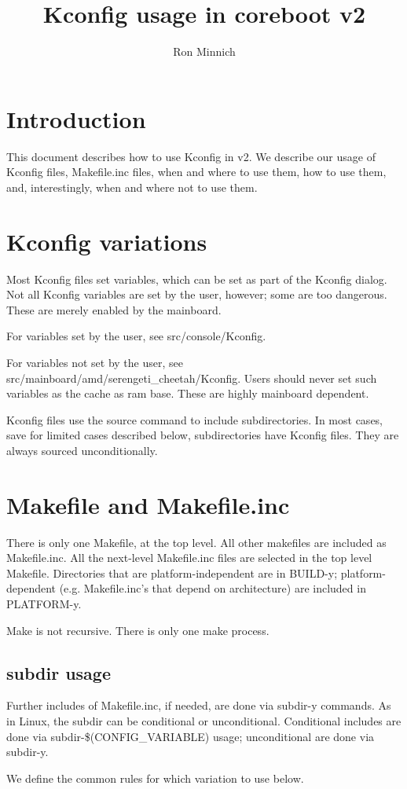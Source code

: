 \documentclass[10pt,letterpaper]{article}
\author{Ron Minnich}
\title{Kconfig usage in coreboot v2}
\begin{document}
\section{Introduction}
This document describes how to use Kconfig in v2. We describe our usage of Kconfig files, Makefile.inc files, when and where to use them, how to use them, and, interestingly, when and where not to use them. 
\section{Kconfig variations}
Most Kconfig files set variables, which can be set as part of the Kconfig dialog. Not all Kconfig variables are set by the user, however; some are too dangerous. These are merely enabled by the mainboard. 

For variables set by the user, see src/console/Kconfig. 

For variables not set by the user, see src/mainboard/amd/serengeti\_cheetah/Kconfig. Users should never set such variables as the cache as ram base. These are highly mainboard dependent. 

Kconfig files use the source command to include subdirectories. In most cases, save for limited cases described below, subdirectories have Kconfig files. They are always sourced unconditionally. 

\section{Makefile and Makefile.inc}
There is only one Makefile, at the top level. All other makefiles are included as Makefile.inc. All the next-level Makefile.inc files are selected in the top level Makefile. Directories that are platform-independent are in BUILD-y; platform-dependent (e.g. Makefile.inc's that depend on architecture) are included in PLATFORM-y. 

Make is not recursive. There is only one make process. 
\subsection{subdir usage}
Further includes of Makefile.inc, if needed, are done via subdir-y commands. As in Linux, the subdir can be conditional or unconditional. Conditional includes are done via subdir-\$(CONFIG\_VARIABLE) usage; unconditional are done via subdir-y. 

We define the common rules for which variation to use below. 
\end{document}
